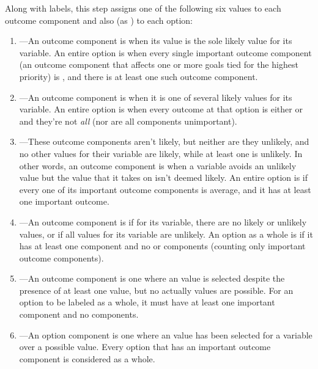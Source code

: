 \begin{enumerate}
Along with  labels, this step assigns one of the following six  values to each outcome component and also (as ) to each option:
%
\begin{enumerate}
\item
%
---An outcome component is  when its value is the sole likely value for its variable.
%
An entire option is  when every single important outcome component (an outcome component that affects one or more goals tied for the highest priority) is , and there is at least one such outcome component.
%
\item {}---An outcome component is  when it is one of several likely values for its variable.
%
An entire option is  when every outcome at that option is either   or  and they're not \emph{all}  (nor are all components unimportant).
%
\item {}---These outcome components aren't likely, but neither are they unlikely, and no other values for their variable are likely, while at least one is unlikely.
%
In other words, an outcome component is  when a variable avoids an unlikely value but the value that it takes on isn't deemed likely.
%
An entire option is  if every one of its important outcome components is average, and it has at least one important outcome.

\item {}---An outcome component is  if for its variable, there are no likely or unlikely values, or if all values for its variable are unlikely.
%
An option as a whole is  if it has at least one  component and no  or  components (counting only important outcome components).
\item {}---An  outcome component is one where an  value is selected despite the presence of at least one  value, but no actually  values are possible.
%
For an option to be labeled  as a whole, it must have at least one important  component and no  components.
\item {}---An  option component is one where an  value has been selected for a variable over a possible  value.
%
Every option that has an important  outcome component is considered  as a whole.
\end{enumerate}


\end{enumerate}
